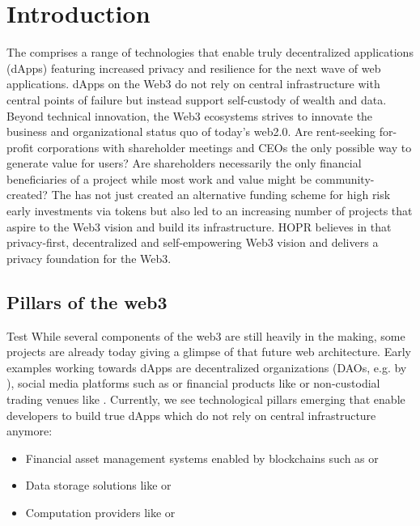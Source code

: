 \section{Introduction}

The  comprises a range of technologies that enable truly decentralized applications (dApps) featuring increased privacy and resilience for the next wave of web applications. dApps on the Web3 do not rely on central infrastructure with central points of failure but instead support self-custody of wealth and data. Beyond technical innovation, the Web3 ecosystems strives to innovate the business and organizational status quo of today's web2.0. Are rent-seeking for-profit corporations with shareholder meetings and CEOs the only possible way to generate value for users? Are shareholders necessarily the only financial beneficiaries of a project while most work and value might be community-created? The  has not just created an alternative funding scheme for high risk early investments via tokens but also led to an increasing number of projects that aspire to the Web3 vision and build its infrastructure. HOPR believes in that privacy-first, decentralized and self-empowering Web3 vision and delivers a privacy foundation for the Web3.

\subsection{Pillars of the web3}
Test While several components of the web3 are still heavily in the making, some projects are already today giving a glimpse of that future web architecture. Early examples working towards dApps are decentralized organizations (DAOs, e.g. by ), social media platforms such as  or financial products like  or non-custodial trading venues like . Currently, we see technological pillars emerging that enable developers to build true dApps which do not rely on central infrastructure anymore:
\begin{itemize}
    \item Financial asset management systems enabled by blockchains such as  or 
    \item Data storage solutions like  or 
    \item Computation providers like  or 
\end{itemize}

